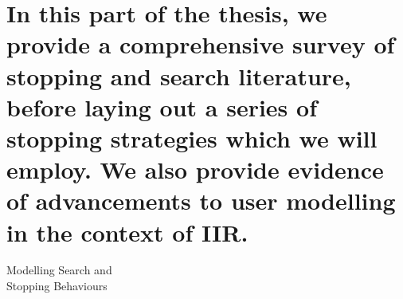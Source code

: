 
\part[Stopping and IIR Modelling]{In this part of the thesis, we provide a comprehensive survey of stopping and search literature, before laying out a series of stopping strategies which we will employ. We also provide evidence of advancements to user modelling in the context of IIR.}{Modelling Search and\\Stopping Behaviours}\label{part:stopping}